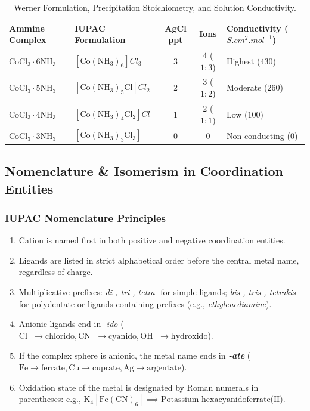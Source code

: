 \documentclass[10pt,twoside,openright]{book}
\begin{document}
\begin{table}[htbp]
\centering
\small
\renewcommand{\arraystretch}{1.25}
{\fontsize{7.5pt}{9.0pt}\selectfont\setlength{\tabcolsep}{1.5pt}
\begin{tabularx}{\linewidth}{l l c c >{\RaggedRight}X}
\toprule
\textbf{Ammine Complex} & \textbf{IUPAC Formulation} & \textbf{AgCl ppt} & \textbf{Ions} & \textbf{Conductivity ($\si{S.cm^2.mol^{-1}}$)} \\
\midrule
$\mathrm{CoCl_3\cdot 6NH_3}$ & $[\mathrm{Co(NH_3)_6}]Cl_3$ & $3$ & $4$ ($1:3$) & Highest ($430$) \\
$\mathrm{CoCl_3\cdot 5NH_3}$ & $[\mathrm{Co(NH_3)_5Cl}]Cl_2$ & $2$ & $3$ ($1:2$) & Moderate ($260$) \\
$\mathrm{CoCl_3\cdot 4NH_3}$ & $[\mathrm{Co(NH_3)_4Cl_2}]Cl$ & $1$ & $2$ ($1:1$) & Low ($100$) \\
$\mathrm{CoCl_3\cdot 3NH_3}$ & $[\mathrm{Co(NH_3)_3Cl_3}]$ & $0$ & $0$ & Non-conducting ($0$) \\
\bottomrule
\end{tabularx}}
\caption{Werner Formulation, Precipitation Stoichiometry, and Solution Conductivity.}
\end{table}

\subsection{Nomenclature \& Isomerism in Coordination Entities}
\subsubsection{IUPAC Nomenclature Principles}
\begin{enumerate}
  \item Cation is named first in both positive and negative coordination entities.
  \item Ligands are listed in strict alphabetical order before the central metal name, regardless of charge.
  \item Multiplicative prefixes: \textit{di-, tri-, tetra-} for simple ligands; \textit{bis-, tris-, tetrakis-} for polydentate or ligands containing prefixes (e.g., \textit{ethylenediamine}).
  \item Anionic ligands end in \textit{-ido} ($\mathrm{Cl^-} \to \text{chlorido}, \mathrm{CN^-} \to \text{cyanido}, \mathrm{OH^-} \to \text{hydroxido}$).
  \item If the complex sphere is anionic, the metal name ends in \textbf{\textit{-ate}} ($\mathrm{Fe} \to \text{ferrate}, \mathrm{Cu} \to \text{cuprate}, \mathrm{Ag} \to \text{argentate}$).
  \item Oxidation state of the metal is designated by Roman numerals in parentheses: e.g., $\mathrm{K_4[Fe(CN)_6]} \implies \text{Potassium hexacyanidoferrate(II)}$.
\end{enumerate}
\end{document}
